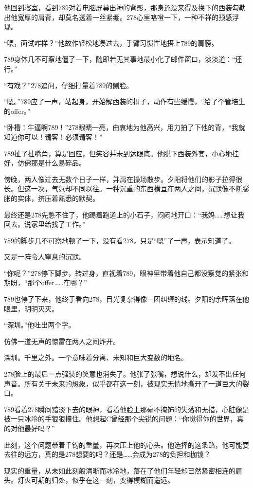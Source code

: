 \documentclass[a4paper]{book}
\begin{document}
他回到寝室，看到789对着电脑屏幕出神的背影，那身还没来得及换下的西装勾勒出他宽厚的肩背，却莫名透着一丝紧绷。278心里咯噔一下，一种不祥的预感浮现。

“喂，面试咋样？”他故作轻松地凑过去，手臂习惯性地搭上789的肩膀。

789身体几不可察地僵了一下，随即若无其事地最小化了邮件窗口，淡淡道：“还行。”

“有戏？”278追问，仔细打量着789的侧脸。

“嗯。”789应了一声，站起身，开始解西装的扣子，动作有些缓慢，“给了个管培生的offer。”

“卧槽！牛逼啊789！”278眼睛一亮，由衷地为他高兴，用力拍了下他的背，“我就知道你可以！请客！必须请客！”

789扯了扯嘴角，算是回应，但笑容并未到达眼底。他脱下西装外套，小心地挂好，仿佛那是什么易碎品。

傍晚，两人像过去无数个日子一样，并肩在操场散步。夕阳将他们的影子拉得很长。但这一次，气氛却不同以往。一种沉重的东西横亘在两人之间，沉默像不断膨胀的实体，挤压着熟悉的默契。

最终还是278先憋不住了，他踢着跑道上的小石子，闷闷地开口：“我妈……想让我回去。说家里给找了工作。”

789的脚步几不可察地顿了一下，没有看278，只是“嗯”了一声，表示知道了。

又是一阵令人窒息的沉默。

“你呢？”278停下脚步，转过身，直视着789，眼神里带着他自己都没察觉的紧张和期盼，“那个offer……在哪？”

789也停了下来，他终于看向278，目光复杂得像一团纠缠的线。夕阳的余晖落在他眼里，明明灭灭。

“深圳。”他吐出两个字。

仿佛一道无声的惊雷在两人之间炸开。

深圳。千里之外。一个意味着分离、未知和巨大变数的地名。

278脸上的最后一点强装的笑意也消失了。他张了张嘴，想说什么，却发不出任何声音。所有关于未来的想象，似乎都在这一刻，被现实无情地撕开了一道巨大的裂口。

789看着278瞬间黯淡下去的眼神，看着他脸上那毫不掩饰的失落和无措，心脏像是被一只冰冷的手狠狠攥住。他想起C曾经那个尖锐的问题：“你觉得你的世界，真的对他最好吗？”

此刻，这个问题带着千钧的重量，再次压上他的心头。他选择的这条路，他可能要去往的远方，真的是278想要的吗？还是……会成为278的负担和枷锁？

现实的重量，从未如此刻般清晰而冰冷地，落在了他们年轻却已然紧密相连的肩头。灯火可期的归处，似乎在这一刻，变得模糊而遥远。
\end{document}
